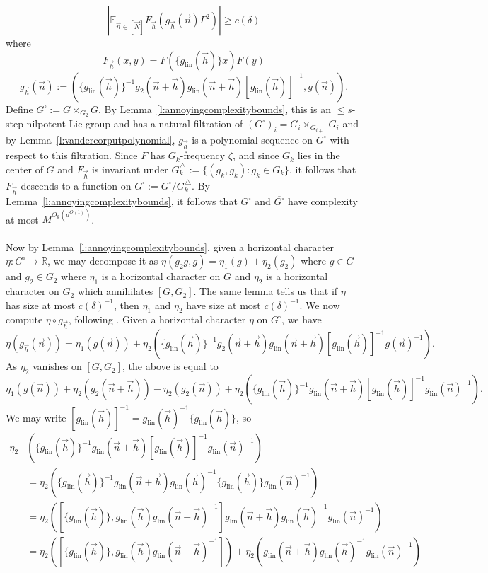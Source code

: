 \documentclass[11pt, a4paper]{amsart}
\theoremstyle{plain}
\theoremstyle{plain}
\theoremstyle{definition}
\theoremstyle{remark}
\numberwithin{equation}{section}
\numberwithin{lemma}{section}
\numberwithin{proposition}{section}
\numberwithin{corollary}{section}
\numberwithin{definition}{section}
\numberwithin{claim}{section}
\begin{document}
$$|\mathbb{E}_{\vec{n} \in [\vec{N}]} F_{\vec{h}}(g_{\vec{h}}(\vec{n})\Gamma^2)| \ge c(\delta)$$
where
$$F_{\vec{h}}(x, y) = F(\{g_{\mathrm{lin}}(\vec{h})\} x)\overline{F(y)}$$
$$g_{\vec{h}}(\vec{n}) := (\{g_{\mathrm{lin}}(\vec{h})\}^{-1}g_2(\vec{n} + \vec{h})g_{\mathrm{lin}}(\vec{n} + \vec{h})[g_{\mathrm{lin}}(\vec{h})]^{-1}, g(\vec{n})).$$
Define $G^\square := G \times_{G_2} G$. By Lemma~\ref{l:annoyingcomplexitybounds}, this is an $\le s$-step nilpotent Lie group and has a natural filtration of $(G^\square)_i = G_i \times_{G_{i + 1}} G_i$ and by Lemma~\ref{l:vandercorputpolynomial}, $g_{\vec{h}}$ is a polynomial sequence on $G^\square$ with respect to this filtration. Since $F$ has $G_k$-frequency $\zeta$, and since $G_k$ lies in the center of $G$ and $F_{\vec{h}}$ is invariant under $G_k^\triangle :=\{(g_k,g_k) : g_k\in G_k\}$, it follows that $F_{\vec{h}}$ descends to a function on $\overline{G^\square} := G^\square/G_k^\triangle$. By Lemma~\ref{l:annoyingcomplexitybounds}, it follows that $G^\square$ and $\overline{G^\square}$ have complexity at most $M^{O_{k}(d^{O(1)})}$.\\\\
Now by Lemma~\ref{l:annoyingcomplexitybounds}, given a horizontal character $\eta\colon G^\square \to \mathbb{R}$, we may decompose it as $\eta(g_2g, g) = \eta_1(g) + \eta_2(g_2)$ where $g \in G$ and $g_2 \in G_2$ where $\eta_1$ is a horizontal character on $G$ and $\eta_2$ is a horizontal character on $G_2$ which annihilates $[G, G_2]$. The same lemma tells us that if $\eta$ has size at most $c(\delta)^{-1}$, then $\eta_1$ and $\eta_2$ have size at most $c(\delta)^{-1}$. We now compute $\eta \circ g_{\vec{h}}$, following \cite[p. 13-14]{GT14}. Given a horizontal character $\eta$ on $G^\square$, we have
$$\eta(g_{\vec{h}}(\vec{n})) = \eta_1(g(\vec{n})) + \eta_2(\{g_{\mathrm{lin}}(\vec{h})\}^{-1}g_2(\vec{n} + \vec{h})g_{\mathrm{lin}}(\vec{n} + \vec{h})[g_{\mathrm{lin}}(\vec{h})]^{-1}g(\vec{n})^{-1}).$$
As $\eta_2$ vanishes on $[G, G_2]$, the above is equal to
$$\eta_1(g(\vec{n})) + \eta_2(g_2(\vec{n} + \vec{h})) - \eta_2(g_2(\vec{n})) + \eta_2(\{g_{\mathrm{lin}}(\vec{h})\}^{-1}g_{\mathrm{lin}}(\vec{n} + \vec{h})[g_{\mathrm{lin}}(\vec{h})]^{-1}g_{\mathrm{lin}}(\vec{n})^{-1}).$$
We may write $[g_{\mathrm{lin}}(\vec{h})]^{-1} = g_{\mathrm{lin}}(\vec{h})^{-1}\{g_{\mathrm{lin}}(\vec{h})\}$, so
\begin{align*}
\eta_2&(\{g_{\mathrm{lin}}(\vec{h})\}^{-1}g_{\mathrm{lin}}(\vec{n} + \vec{h})[g_{\mathrm{lin}}(\vec{h})]^{-1}g_{\mathrm{lin}}(\vec{n})^{-1}) \\
&= \eta_2(\{g_{\mathrm{lin}}(\vec{h})\}^{-1}g_{\mathrm{lin}}(\vec{n} + \vec{h})g_{\mathrm{lin}}(\vec{h})^{-1}\{g_{\mathrm{lin}}(\vec{h})\}g_{\mathrm{lin}}(\vec{n})^{-1}) \\
&= \eta_2([\{g_{\mathrm{lin}}(\vec{h})\}, g_{\mathrm{lin}}(\vec{h})g_{\mathrm{lin}}(\vec{n} + \vec{h})^{-1}] g_{\mathrm{lin}}(\vec{n} + \vec{h}) g_{\mathrm{lin}}(\vec{h})^{-1} g_{\mathrm{lin}}(\vec{n})^{-1}) \\
&= \eta_2([\{g_{\mathrm{lin}}(\vec{h})\}, g_{\mathrm{lin}}(\vec{h})g_{\mathrm{lin}}(\vec{n} + \vec{h})^{-1}]) + \eta_2(g_{\mathrm{lin}}(\vec{n} + \vec{h})g_{\mathrm{lin}}(\vec{h})^{-1}g_{\mathrm{lin}}(\vec{n})^{-1})
\end{align*}
\end{document}

